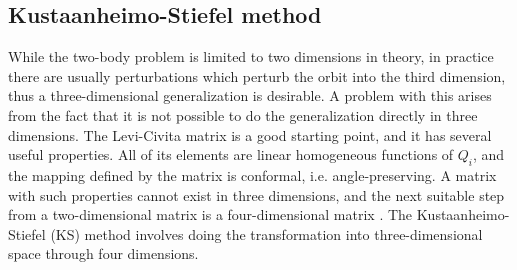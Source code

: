 \documentclass[english, oneside]{HYgradu}
\begin{document}
\subsection{Kustaanheimo-Stiefel method} \label{sect:KSmethod}
While the two-body problem is limited to two dimensions in theory, in practice there are usually perturbations which perturb the orbit into the third dimension, thus a three-dimensional generalization is desirable. A problem with this arises from the fact that it is not possible to do the generalization directly in three dimensions. The Levi-Civita matrix is a good starting point, and it has several useful properties. All of its elements are linear homogeneous functions of $Q_i$, and the mapping defined by the matrix is conformal, i.e. angle-preserving. A matrix with such properties cannot exist in three dimensions, and the next suitable step from a two-dimensional matrix is a four-dimensional matrix \citep{diplomarbeit}. The Kustaanheimo-Stiefel (KS) method involves doing the transformation into three-dimensional space through four dimensions.
\end{document}
